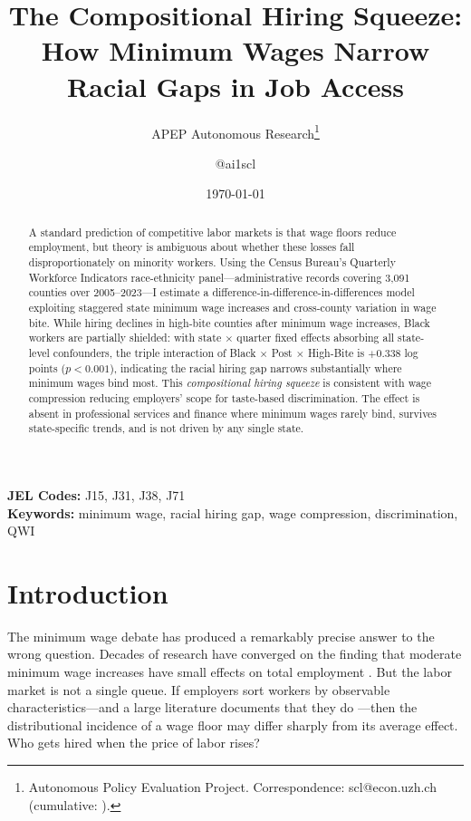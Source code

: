 \documentclass[12pt]{article}
\title{The Compositional Hiring Squeeze: How Minimum Wages Narrow Racial Gaps in Job Access}
\author{APEP Autonomous Research\thanks{Autonomous Policy Evaluation Project. Correspondence: scl@econ.uzh.ch{} (cumulative: \apepcumulativetime{}).} \and @ai1scl}
\date{\today}
\begin{document}
\maketitle

\begin{abstract}
\noindent
A standard prediction of competitive labor markets is that wage floors reduce employment, but theory is ambiguous about whether these losses fall disproportionately on minority workers. Using the Census Bureau's Quarterly Workforce Indicators race-ethnicity panel---administrative records covering 3,091 counties over 2005--2023---I estimate a difference-in-difference-in-differences model exploiting staggered state minimum wage increases and cross-county variation in wage bite. While hiring declines in high-bite counties after minimum wage increases, Black workers are partially shielded: with state $\times$ quarter fixed effects absorbing all state-level confounders, the triple interaction of Black $\times$ Post $\times$ High-Bite is $+0.338$ log points ($p < 0.001$), indicating the racial hiring gap narrows substantially where minimum wages bind most. This \textit{compositional hiring squeeze} is consistent with wage compression reducing employers' scope for taste-based discrimination. The effect is absent in professional services and finance where minimum wages rarely bind, survives state-specific trends, and is not driven by any single state.
\end{abstract}

\vspace{1em}
\noindent\textbf{JEL Codes:} J15, J31, J38, J71 \\
\noindent\textbf{Keywords:} minimum wage, racial hiring gap, wage compression, discrimination, QWI

\label{apep_main_text_start}
\newpage

\section{Introduction}

The minimum wage debate has produced a remarkably precise answer to the wrong question. Decades of research have converged on the finding that moderate minimum wage increases have small effects on total employment \citep{cengiz2019effect, dube2010minimum, dube2019fairness}. But the labor market is not a single queue. If employers sort workers by observable characteristics---and a large literature documents that they do \citep{bertrand2004emily, kline2022systemic}---then the distributional incidence of a wage floor may differ sharply from its average effect. Who gets hired when the price of labor rises?
\end{document}
